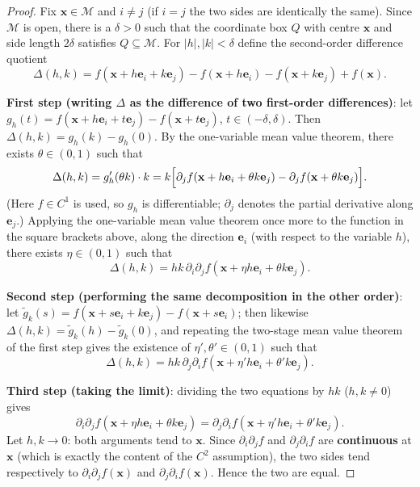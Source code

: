 \begin{proof}
Fix $\mathbf x\in\mathcal M$ and $i\ne j$ (if $i=j$ the two sides are identically the same). Since $\mathcal M$ is open, there is a $\delta>0$ such that the coordinate box $Q$ with centre $\mathbf x$ and side length $2\delta$ satisfies $Q\subseteq\mathcal M$. For $|h|,|k|<\delta$ define the second-order difference quotient
\[
\Delta(h,k) = f(\mathbf x+h\mathbf e_i+k\mathbf e_j) - f(\mathbf x+h\mathbf e_i) - f(\mathbf x+k\mathbf e_j) + f(\mathbf x).
\]

\textbf{First step (writing $\Delta$ as the difference of two first-order differences)}: let $g_h(t) = f(\mathbf x+h\mathbf e_i+t\mathbf e_j) - f(\mathbf x+t\mathbf e_j)$, $t\in(-\delta,\delta)$. Then $\Delta(h,k) = g_h(k)-g_h(0)$. By the one-variable mean value theorem, there exists $\theta\in(0,1)$ such that
\[
\Delta(h,k) = g_h'(\theta k)\cdot k
= k\Bigl[\partial_j f(\mathbf x+h\mathbf e_i+\theta k\mathbf e_j) - \partial_j f(\mathbf x+\theta k\mathbf e_j)\Bigr].
\]
(Here $f\in C^1$ is used, so $g_h$ is differentiable; $\partial_j$ denotes the partial derivative along $\mathbf e_j$.) Applying the one-variable mean value theorem once more to the function in the square brackets above, along the direction $\mathbf e_i$ (with respect to the variable $h$), there exists $\eta\in(0,1)$ such that
\[
\Delta(h,k) = hk\,\partial_i\partial_j f(\mathbf x+\eta h\mathbf e_i+\theta k\mathbf e_j).
\]

\textbf{Second step (performing the same decomposition in the other order)}: let $\tilde g_k(s) = f(\mathbf x+s\mathbf e_i+k\mathbf e_j)-f(\mathbf x+s\mathbf e_i)$; then likewise $\Delta(h,k)=\tilde g_k(h)-\tilde g_k(0)$, and repeating the two-stage mean value theorem of the first step gives the existence of $\eta',\theta'\in(0,1)$ such that
\[
\Delta(h,k) = hk\,\partial_j\partial_i f(\mathbf x+\eta' h\mathbf e_i+\theta' k\mathbf e_j).
\]

\textbf{Third step (taking the limit)}: dividing the two equations by $hk$ ($h,k\ne0$) gives
\[
\partial_i\partial_j f(\mathbf x+\eta h\mathbf e_i+\theta k\mathbf e_j)
= \partial_j\partial_i f(\mathbf x+\eta' h\mathbf e_i+\theta' k\mathbf e_j).
\]
Let $h,k\to0$: both arguments tend to $\mathbf x$. Since $\partial_i\partial_j f$ and $\partial_j\partial_i f$ are \textbf{continuous} at $\mathbf x$ (which is exactly the content of the $C^2$ assumption), the two sides tend respectively to $\partial_i\partial_j f(\mathbf x)$ and $\partial_j\partial_i f(\mathbf x)$. Hence the two are equal.
\end{proof}

